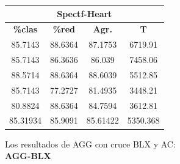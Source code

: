 \documentclass[11pt,a4paper]{article}
\theoremstyle{definition}
\begin{document}
\begin{tabbing}
{		\begin{tabular}{|c|c|c|c|}
			\hline
			\multicolumn{4}{|c|}{\textbf{Spectf-Heart}} \\ \hline
			\textbf{\%clas} & \textbf{\%red} & \textbf{Agr.} & \textbf{T} \\ \hline 
			85.7143	 & 88.6364	&87.1753	 & 6719.91 \\ \hline
85.7143	&  86.3636&	86.039	 & 7458.06 \\ \hline
88.5714	 & 88.6364	&88.6039	 & 5512.85 \\ \hline
85.7143	 & 77.2727	&81.4935	 & 3448.21 \\ \hline
80.8824	 & 88.6364	&84.7594	 & 3612.81 \\ \hline
85.31934&	85.9091	&85.61422	&5350.368 \\ \hline
		\end{tabular}
		}
	\end{tabbing}
	
	Los resultados de AGG con cruce BLX y AC: ~\\
	
	\textbf{AGG-BLX}
	
\end{document}
